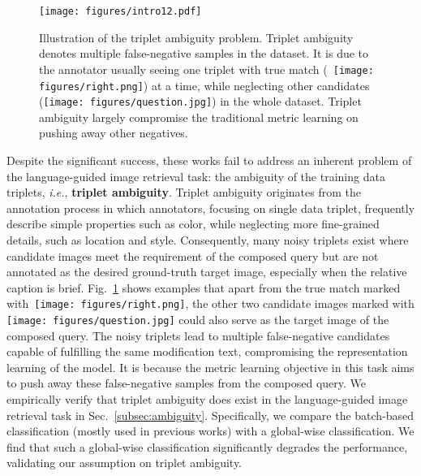 \documentclass[sigconf]{acmart}
\def\ie{\emph{i.e.}}
\begin{document}
\begin{figure}[t]
    \centering
    \texttt{[image: figures/intro12.pdf]}
    \caption{Illustration of the triplet ambiguity problem. Triplet ambiguity denotes multiple false-negative samples in the dataset. It is due to the annotator usually seeing one triplet with true match (\!~\protect\texttt{[image: figures/right.png]}) at a time, while neglecting other candidates (\protect\texttt{[image: figures/question.jpg]}) in the whole dataset. Triplet ambiguity largely compromise the traditional metric learning on pushing away other negatives.
    }
    \label{fig:intro}
\end{figure}

Despite the significant success, these works fail to address an inherent problem of the language-guided image retrieval task: the ambiguity of the training data triplets, \ie, \textbf{triplet ambiguity}. Triplet ambiguity originates from the annotation process in which annotators, focusing on single data triplet, frequently describe simple properties such as color, while neglecting more fine-grained details, such as location and style. Consequently, many noisy triplets exist where candidate images meet the requirement of the composed query but are not annotated as the desired ground-truth target image, especially when the relative caption is brief. Fig.~\ref{fig:intro} shows examples that apart from the true match marked with\!~\protect\texttt{[image: figures/right.png]}, the other two candidate images marked with \protect\texttt{[image: figures/question.jpg]} could also serve as the target image of the composed query. 
The noisy triplets lead to multiple false-negative candidates capable of fulfilling the same modification text, compromising the representation learning of the model. It is because the metric learning objective in this task aims to push away these false-negative samples from the composed query. 
We empirically verify that triplet ambiguity does exist in the language-guided image retrieval task in Sec.~\!\ref{subsec:ambiguity}. Specifically, we compare the batch-based classification (mostly used in previous works) with a global-wise classification.
We find that such a global-wise classification significantly degrades the performance, validating our assumption on triplet ambiguity.
\end{document}
